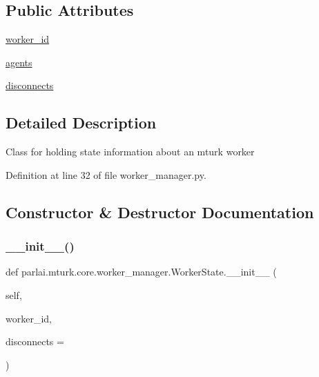 \subsection*{Public Attributes}
\begin{DoxyCompactItemize}
\item 
\hyperlink{classparlai_1_1mturk_1_1core_1_1worker__manager_1_1WorkerState_a5cb2de9dfc1d8d0b07f693a9e6fabe72}{worker\+\_\+id}
\item 
\hyperlink{classparlai_1_1mturk_1_1core_1_1worker__manager_1_1WorkerState_a53912abee55c0bd1caaf5575c001d575}{agents}
\item 
\hyperlink{classparlai_1_1mturk_1_1core_1_1worker__manager_1_1WorkerState_ab751a2c9f79305a2db1439cd9449006a}{disconnects}
\end{DoxyCompactItemize}


\subsection{Detailed Description}
\begin{DoxyVerb}Class for holding state information about an mturk worker\end{DoxyVerb}
 

Definition at line 32 of file worker\+\_\+manager.\+py.



\subsection{Constructor \& Destructor Documentation}
\mbox{\label{classparlai_1_1mturk_1_1core_1_1worker__manager_1_1WorkerState_a93ec8410562403157cbf3ac4199761ac}} 
\subsubsection{\texorpdfstring{\+\_\+\+\_\+init\+\_\+\+\_\+()}{\_\_init\_\_()}}
{\footnotesize\ttfamily def parlai.\+mturk.\+core.\+worker\+\_\+manager.\+Worker\+State.\+\_\+\+\_\+init\+\_\+\+\_\+ (\begin{DoxyParamCaption}\item[{}]{self,  }\item[{}]{worker\+\_\+id,  }\item[{}]{disconnects = {} }\end{DoxyParamCaption})}

